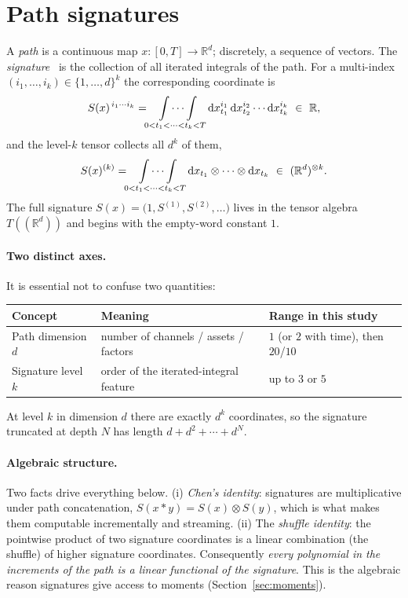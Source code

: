 \documentclass[11pt]{article}
\newcommand{\dd}{\mathrm{d}}
\newcommand{\R}{\mathbb{R}}
\begin{document}
\section{Path signatures}\label{sec:sig}
A \emph{path} is a continuous map $x:[0,T]\to\R^d$; discretely, a sequence of
vectors. The \emph{signature}~\cite{Chen1957,Lyons1998,LyonsCaruanaLevy2007} is the
collection of all iterated integrals of the path. For a multi-index
$(i_1,\dots,i_k)\in\{1,\dots,d\}^k$ the corresponding coordinate is
\begin{equation}
  S(x)^{\,i_1\cdots i_k}
  = \idotsint\limits_{0<t_1<\cdots<t_k<T}
    \dd x^{i_1}_{t_1}\,\dd x^{i_2}_{t_2}\cdots \dd x^{i_k}_{t_k}\ \in\ \R,
\end{equation}
and the level-$k$ tensor collects all $d^{k}$ of them,
\begin{equation}
  S(x)^{(k)} = \idotsint\limits_{0<t_1<\cdots<t_k<T}
  \dd x_{t_1}\otimes\cdots\otimes\dd x_{t_k}\ \in\ (\R^{d})^{\otimes k}.
\end{equation}
The full signature $S(x) = \big(1, S^{(1)}, S^{(2)}, \dots\big)$ lives in the tensor
algebra $T((\R^d))$ and begins with the empty-word constant $1$.

\paragraph{Two distinct axes.}
It is essential not to confuse two quantities:
\begin{center}
\begin{tabular}{@{}lll@{}}
\toprule
Concept & Meaning & Range in this study \\
\midrule
Path dimension $d$ & number of channels / assets / factors & $1$ (or $2$ with time), then $20$/$10$ \\
Signature level $k$ & order of the iterated-integral feature & up to $3$ or $5$ \\
\bottomrule
\end{tabular}
\end{center}
At level $k$ in dimension $d$ there are exactly $d^{k}$ coordinates, so the
signature truncated at depth $N$ has length $d + d^2 + \cdots + d^{N}$.

\paragraph{Algebraic structure.}
Two facts drive everything below. (i) \emph{Chen's identity}: signatures are
multiplicative under path concatenation, $S(x\ast y)=S(x)\otimes S(y)$, which is
what makes them computable incrementally and streaming. (ii) The \emph{shuffle
identity}: the pointwise product of two signature coordinates is a linear
combination (the shuffle) of higher signature coordinates. Consequently
\emph{every polynomial in the increments of the path is a linear functional of the
signature}. This is the algebraic reason signatures give access to moments
(Section~\ref{sec:moments}).
\end{document}

